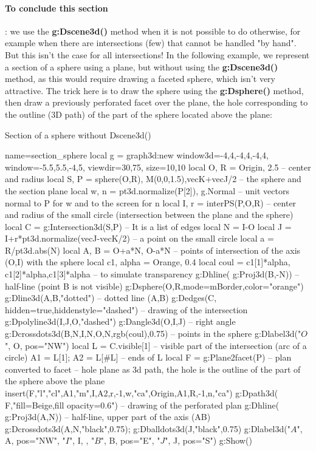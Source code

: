 \paragraph{To conclude this section}: we use the \textbf{g:Dscene3d()} method when it is not possible to do otherwise, for example when there are intersections (few) that cannot be handled "by hand". But this isn't the case for all intersections! In the following example, we represent a section of a sphere using a plane, but without using the \textbf{g:Dscene3d()} method, as this would require drawing a faceted sphere, which isn't very attractive. The trick here is to draw the sphere using the \textbf{g:Dsphere()} method, then draw a previously perforated facet over the plane, the hole corresponding to the outline (3D path) of the part of the sphere located above the plane:

\begin{demo}{Section of a sphere without Dscene3d()}
\begin{luadraw}{name=section_sphere}
local g = graph3d:new{ window3d={-4,4,-4,4,-4,4}, window={-5.5,5.5,-4,5}, viewdir={30,75}, size={10,10}}
local O, R = Origin, 2.5 -- center and radius
local S, P = sphere(O,R), {M(0,0,1.5),vecK+vecJ/2} -- the sphere and the section plane
local w, n = pt3d.normalize(P[2]), g.Normal -- unit vectors normal to P for w and to the screen for n
local I, r = interPS(P,{O,R}) -- center and radius of the small circle (intersection between the plane and the sphere)
local C = g:Intersection3d(S,P) -- It is a list of edges
local N = I-O
local J = I+r*pt3d.normalize(vecJ-vecK/2) -- a point on the small circle
local a = R/pt3d.abs(N)
local A, B = O+a*N, O-a*N -- points of intersection of the axis (O,I) with the sphere
local c1, alpha = Orange, 0.4
local coul = {c1[1]*alpha, c1[2]*alpha,c1[3]*alpha} -- to simulate transparency
g:Dhline( g:Proj3d({B,-N})) -- half-line (point B is not visible)
g:Dsphere(O,R,{mode=mBorder,color="orange"})
g:Dline3d(A,B,"dotted") -- dotted line (A,B)
g:Dedges(C, {hidden=true,hiddenstyle="dashed"}) -- drawing of the intersection
g:Dpolyline3d({I,J,O},"dashed") 
g:Dangle3d(O,I,J)  -- right angle
g:Dcrossdots3d({{B,N},{I,N},{O,N}},rgb(coul),0.75) -- points in the sphere
g:Dlabel3d("$O$", O, {pos="NW"})
local L = C.visible[1] -- visible part of the intersection (arc of a circle)
A1 = L[1]; A2 = L[#L] -- ends of L
local F = g:Plane2facet(P) -- plan converted to facet
-- hole plane as 3d path, the hole is the outline of the part of the sphere above the plane
insert(F,{"l","cl",A1,"m",I,A2,r,-1,w,"ca",Origin,A1,R,-1,n,"ca"})
g:Dpath3d( F,"fill=Beige,fill opacity=0.6") -- drawing of the perforated plan
g:Dhline( g:Proj3d({A,N})) -- half-line, upper part of the axis (AB)
g:Dcrossdots3d({A,N},"black",0.75); g:Dballdots3d(J,"black",0.75)
g:Dlabel3d("$A$", A, {pos="NW"}, "$I$", I, {}, "$B$", B, {pos="E"}, "$J$", J, {pos="S"})
g:Show()            
\end{luadraw}
\end{demo}
